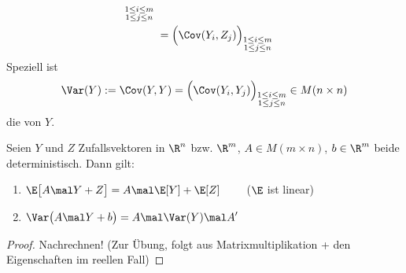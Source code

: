 \begin{definition}
\begin{enumerate}[label=(\arabic*)]
\begin{align*}
{\begin{subarray}{c}
			1\leq i\leq m\\
			1\leq j\leq n
		\end{subarray}}\\
		&~=\Big(\Cov(Y_i,Z_j)\Big)_{\begin{subarray}{c}
			1\leq i\leq m\\
			1\leq j\leq n
		\end{subarray}}
		\end{align*}
		Speziell ist
		\begin{align*}
			\Var(Y):=\Cov(Y,Y)=\Big(\Cov(Y_i,Y_j)\Big)_{\begin{subarray}{c}
			1\leq i\leq m\\
			1\leq j\leq n
		\end{subarray}}\in M(n\times n)
		\end{align*}
		die  von $Y$.
	\end{enumerate}
\end{definition}

\begin{satz}\label{satz3.2}
	Seien $Y$ und $Z$ Zufallsvektoren in $\R^n$ bzw. $\R^m$, $A\in M(m\times n)$, $b\in\R^m$ beide deterministisch.
	Dann gilt:
	\begin{enumerate}[label=(\arabic*)]
		\item $\begin{aligned}
			\E\big[A\mal Y+Z\big]=A\mal\E[Y]+\E[Z]
		\end{aligned}\qquad$ ($\E$ ist linear)
		\label{item:satz3.2(1)}
		\item $\begin{aligned}
			\Var\big(A\mal Y+b\big)=A\mal\Var(Y)\mal A'
		\end{aligned}$
		\label{item:satz3.2(2)}
	\end{enumerate}
\end{satz}

\begin{proof}
	Nachrechnen! (Zur Übung, folgt aus Matrixmultiplikation + den Eigenschaften im reellen Fall)
	
\end{proof}

